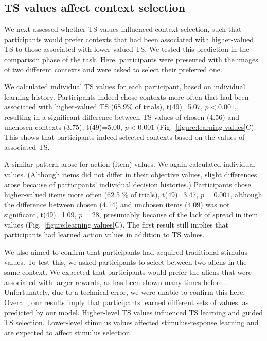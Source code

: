 \documentclass[10pt, letterpaper]{article}
\begin{document}
\subsection{TS values affect context selection}

We next assessed whether TS values influenced context selection, such that participants would prefer contexts that had been associated with higher-valued TS to those associated with lower-valued TS. We tested this prediction in the comparison phase of the task. Here, participants were presented with the images of two different contexts and were asked to select their preferred one. 

We calculated individual TS values for each participant, based on individual learning history. Participants indeed chose contexts more often that had been associated with higher-valued TS (68.9\% of trials), t(49)=5.07, $p<0.001$, resulting in a significant difference between TS values of chosen (4.56) and unchosen contexts (3.75), t(49)=5.00, $p<0.001$ (Fig.~\ref{figure:learning values}C). This shows that participants indeed selected contexts based on the values of associated TS.

A similar pattern arose for action (item) values. We again calculated individual values. (Although items did not differ in their objective values, slight differences arose because of participants' individual decision histories.) Participants chose higher-valued items more often (62.5 \% of trials), t(49)=3.47, $p=0.001$, although the difference between chosen (4.14) and unchosen items (4.09) was not significant, t(49)=1.09, $p=28$, presumably because of the lack of spread in item values (Fig.~\ref{figure:learning values}C). The first result still implies that participants had learned action values in addition to TS values.

We also aimed to confirm that participants had acquired traditional stimulus values. To test this, we asked participants to select between two aliens in the same context. We expected that participants would prefer the aliens that were associated with larger rewards, as has been shown many times before \cite{frank_by_2004}. Unfortunately, due to a technical error, we were unable to confirm this here. Overall, our results imply that participants learned different sets of values, as predicted by our model. Higher-level TS values influenced TS learning and guided TS selection. Lower-level stimulus values affected stimulus-response learning and are expected to affect stimulus selection.
\end{document}
